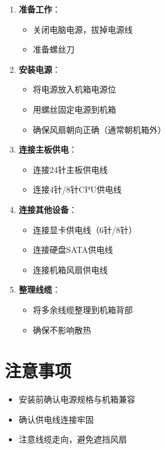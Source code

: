 \documentclass[12pt,UTF8]{ctexbook}
\begin{document}
\begin{enumerate}
    \item \textbf{准备工作}：
    \begin{itemize}[leftmargin=2em]
        \item 关闭电脑电源，拔掉电源线
        \item 准备螺丝刀
    \end{itemize}
    
    \item \textbf{安装电源}：
    \begin{itemize}[leftmargin=2em]
        \item 将电源放入机箱电源位
        \item 用螺丝固定电源到机箱
        \item 确保风扇朝向正确（通常朝机箱外）
    \end{itemize}
    
    \item \textbf{连接主板供电}：
    \begin{itemize}[leftmargin=2em]
        \item 连接24针主板供电线
        \item 连接4针/8针CPU供电线
    \end{itemize}
    
    \item \textbf{连接其他设备}：
    \begin{itemize}[leftmargin=2em]
        \item 连接显卡供电线（6针/8针）
        \item 连接硬盘SATA供电线
        \item 连接机箱风扇供电线
    \end{itemize}
    
    \item \textbf{整理线缆}：
    \begin{itemize}[leftmargin=2em]
        \item 将多余线缆整理到机箱背部
        \item 确保不影响散热
    \end{itemize}
\end{enumerate}

\section{注意事项}

\begin{itemize}[leftmargin=2em]
    \item 安装前确认电源规格与机箱兼容
    \item 确认供电线连接牢固
    \item 注意线缆走向，避免遮挡风扇
\end{itemize}
\end{document}
